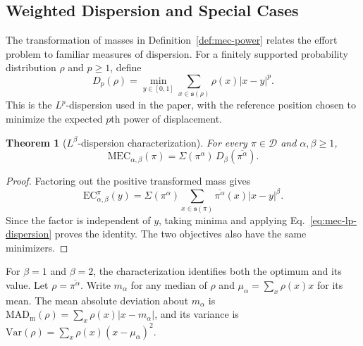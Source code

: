 \documentclass{article}
\theoremstyle{plain}
\newtheorem{theorem}{Theorem}
\theoremstyle{remark}
\begin{document}
\subsection{Weighted Dispersion and Special Cases}\label{subsec:mec-dispersion}

The transformation of masses in Definition~\ref{def:mec-power} relates the effort problem to familiar measures of dispersion. For a finitely supported probability distribution $\rho$ and $p\geq1$, define
\begin{equation}\label{eq:mec-lp-dispersion}
D_p(\rho)=\min_{y\in[0,1]}
          \sum_{x\in\boldsymbol{s}(\rho)}\rho(x)|x-y|^p.
\end{equation}
This is the $L^p$-dispersion used in the paper, with the reference position chosen to minimize the expected $p$th power of displacement.

\begin{theorem}[$L^\beta$-dispersion characterization]\label{th:mec-dispersion}
For every $\pi\in\mathcal{D}$ and $\alpha,\beta\geq1$,
\begin{equation}\label{eq:mec-dispersion-characterization}
\mathrm{MEC}_{\alpha,\beta}(\pi)
=\Sigma(\pi^\alpha)\,D_\beta(\overline{\pi^\alpha}).
\end{equation}
\end{theorem}
\begin{proof}
Factoring out the positive transformed mass gives
\[
\mathrm{EC}_{\alpha,\beta}^{\pi}(y)
=\Sigma(\pi^\alpha)
 \sum_{x\in\boldsymbol{s}(\pi)}\overline{\pi^\alpha}(x)|x-y|^\beta.
\]
Since the factor is independent of $y$, taking minima and applying Eq.~\eqref{eq:mec-lp-dispersion} proves the identity. The two objectives also have the same minimizers.
\end{proof}

For $\beta=1$ and $\beta=2$, the characterization identifies both the optimum and its value. Let $\rho=\overline{\pi^\alpha}$. Write $m_\alpha$ for any median of $\rho$ and $\mu_\alpha=\sum_x\rho(x)x$ for its mean. The mean absolute deviation about $m_\alpha$ is $\mathrm{MAD}_{\mathrm m}(\rho)=\sum_x\rho(x)|x-m_\alpha|$, and its variance is $\mathrm{Var}(\rho)=\sum_x\rho(x)(x-\mu_\alpha)^2$.
\end{document}
